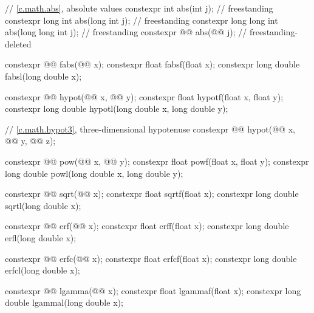 \begin{codeblock}
{  // \ref{c.math.abs}, absolute values
  constexpr int                 abs(int j);                             // freestanding
  constexpr long int            abs(long int j);                        // freestanding
  constexpr long long int       abs(long long int j);                   // freestanding
  constexpr @@ abs(@@ j);             // freestanding-deleted

  constexpr @@ fabs(@@ x);
  constexpr float               fabsf(float x);
  constexpr long double         fabsl(long double x);

  constexpr @@ hypot(@@ x, @@ y);
  constexpr float               hypotf(float x, float y);
  constexpr long double         hypotl(long double x, long double y);

  // \ref{c.math.hypot3}, three-dimensional hypotenuse
  constexpr @@ hypot(@@ x, @@ y,
                                      @@ z);

  constexpr @@ pow(@@ x, @@ y);
  constexpr float               powf(float x, float y);
  constexpr long double         powl(long double x, long double y);

  constexpr @@ sqrt(@@ x);
  constexpr float               sqrtf(float x);
  constexpr long double         sqrtl(long double x);

  constexpr @@ erf(@@ x);
  constexpr float               erff(float x);
  constexpr long double         erfl(long double x);

  constexpr @@ erfc(@@ x);
  constexpr float               erfcf(float x);
  constexpr long double         erfcl(long double x);

  constexpr @@ lgamma(@@ x);
  constexpr float               lgammaf(float x);
  constexpr long double         lgammal(long double x);

}
\end{codeblock}
